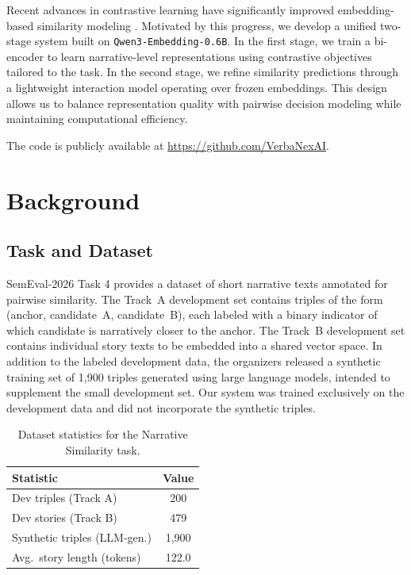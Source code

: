 \documentclass[11pt]{article}
\begin{document}
Recent advances in contrastive learning have significantly improved embedding-based similarity modeling \cite{gao2021simcse}. Motivated by this progress, we develop a unified two-stage system built on \texttt{Qwen3-Embedding-0.6B}. In the first stage, we train a bi-encoder to learn narrative-level representations using contrastive objectives tailored to the task. In the second stage, we refine similarity predictions through a lightweight interaction model operating over frozen embeddings. This design allows us to balance representation quality with pairwise decision modeling while maintaining computational efficiency.

The code is publicly available at \url{https://github.com/VerbaNexAI}.


\section{Background}

\subsection{Task and Dataset}

SemEval-2026 Task 4 provides a dataset of short narrative texts annotated for pairwise similarity. The Track~A development set contains triples of the form (anchor, candidate~A, candidate~B), each labeled with a binary indicator of which candidate is narratively closer to the anchor. The Track~B development set contains individual story texts to be embedded into a shared vector space. In addition to the labeled development data, the organizers released a synthetic training set of 1,900 triples generated using large language models, intended to supplement the small development set. Our system was trained exclusively on the development data and did not incorporate the synthetic triples.

\begin{table}[ht]
  \centering
  \begin{tabular}{lc}
    \hline
    \textbf{Statistic} & \textbf{Value} \\
    \hline
    Dev triples (Track A)           & 200         \\
    Dev stories (Track B)           & 479         \\
    Synthetic triples (LLM-gen.)    & 1,900       \\
    Avg.\ story length (tokens)     & 122.0       \\
    \hline
  \end{tabular}
  \caption{Dataset statistics for the Narrative Similarity task.}
  \label{tab:dataset_stats}
\end{table}
\end{document}
